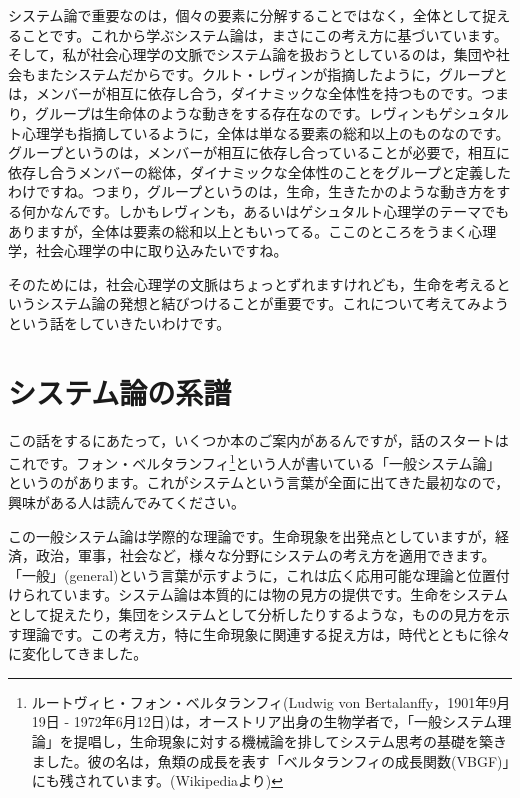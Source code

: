 \documentclass{ltjsbook}
\begin{document}
システム論で重要なのは，個々の要素に分解することではなく，全体として捉えることです。これから学ぶシステム論は，まさにこの考え方に基づいています。
そして，私が社会心理学の文脈でシステム論を扱おうとしているのは，集団や社会もまたシステムだからです。クルト・レヴィンが指摘したように，グループとは，メンバーが相互に依存し合う，ダイナミックな全体性を持つものです。つまり，グループは生命体のような動きをする存在なのです。レヴィンもゲシュタルト心理学も指摘しているように，全体は単なる要素の総和以上のものなのです。グループというのは，メンバーが相互に依存し合っていることが必要で，相互に依存し合うメンバーの総体，ダイナミックな全体性のことをグループと定義したわけですね。つまり，グループというのは，生命，生きたかのような動き方をする何かなんです。しかもレヴィンも，あるいはゲシュタルト心理学のテーマでもありますが，全体は要素の総和以上ともいってる。ここのところをうまく心理学，社会心理学の中に取り込みたいですね。

そのためには，社会心理学の文脈はちょっとずれますけれども，生命を考えるというシステム論の発想と結びつけることが重要です。これについて考えてみようという話をしていきたいわけです。

\section{システム論の系譜}
この話をするにあたって，いくつか本のご案内があるんですが，話のスタートはこれです。フォン・ベルタランフィ\footnote{ルートヴィヒ・フォン・ベルタランフィ(Ludwig von Bertalanffy，1901年9月19日 - 1972年6月12日)は，オーストリア出身の生物学者で，「一般システム理論」を提唱し，生命現象に対する機械論を排してシステム思考の基礎を築きました。彼の名は，魚類の成長を表す「ベルタランフィの成長関数(VBGF)」にも残されています。(Wikipediaより)}という人が書いている「一般システム論」というのがあります\parencite{vonBertalanffy}。これがシステムという言葉が全面に出てきた最初なので，興味がある人は読んでみてください。

この一般システム論は学際的な理論です。生命現象を出発点としていますが，経済，政治，軍事，社会など，様々な分野にシステムの考え方を適用できます。「一般」(general)という言葉が示すように，これは広く応用可能な理論と位置付けられています。システム論は本質的には物の見方の提供です。生命をシステムとして捉えたり，集団をシステムとして分析したりするような，ものの見方を示す理論です。この考え方，特に生命現象に関連する捉え方は，時代とともに徐々に変化してきました。
\end{document}
